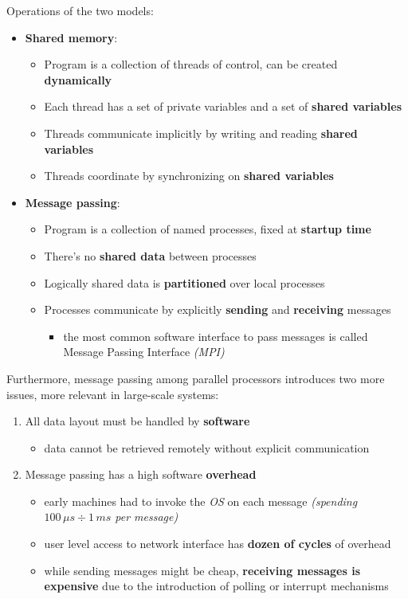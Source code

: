 \documentclass[english]{article}
\begin{document}
Operations of the two models:

\begin{itemize}
  \item \textbf{Shared memory}:
        \begin{itemize}
          \item Program is a collection of threads of control, can be created \textbf{dynamically}
          \item Each thread has a set of private variables and a set of \textbf{shared variables}
          \item Threads communicate implicitly by writing and reading \textbf{shared variables}
          \item Threads coordinate by synchronizing on \textbf{shared variables}
        \end{itemize}
  \item \textbf{Message passing}:
        \begin{itemize}
          \item Program is a collection of named processes, fixed at \textbf{startup time}
          \item There's no \textbf{shared data} between processes
          \item Logically shared data is \textbf{partitioned} over local processes
          \item Processes communicate by explicitly \textbf{sending} and \textbf{receiving} messages
                \begin{itemize}
                  \item the most common software interface to pass messages is called Message Passing Interface \textit{(MPI)}
                \end{itemize}
        \end{itemize}
\end{itemize}

\bigskip
Furthermore, message passing among parallel processors introduces two more issues, more relevant in large-scale systems:

\begin{enumerate}
  \item All data layout must be handled by \textbf{software}
        \begin{itemize}
          \item data cannot be retrieved remotely without explicit communication
        \end{itemize}
  \item Message passing has a high software \textbf{overhead}
        \begin{itemize}
          \item early machines had to invoke the \textit{OS} on each message \textit{(spending \(100\,\mu s \div 1\,ms\) per message)}
          \item user level access to network interface has \textbf{dozen of cycles} of overhead
          \item while sending messages might be cheap, \textbf{receiving messages is expensive} due to the introduction of polling or interrupt mechanisms
        \end{itemize}
\end{enumerate}
\end{document}
